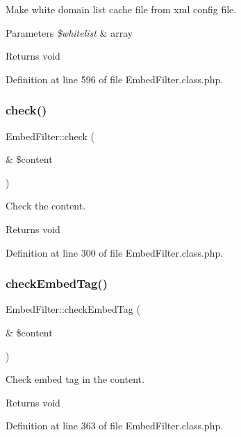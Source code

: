 Make white domain list cache file from xml config file. 
\begin{DoxyParams}{Parameters}
{\em \$whitelist} & array \\
\hline
\end{DoxyParams}
\begin{DoxyReturn}{Returns}
void 
\end{DoxyReturn}


Definition at line 596 of file Embed\+Filter.\+class.\+php.

\mbox{\label{classEmbedFilter_ae494226c2201ff0c6c4c85ba429a16cf}} 
\subsubsection{\texorpdfstring{check()}{check()}}
{\footnotesize\ttfamily Embed\+Filter\+::check (\begin{DoxyParamCaption}\item[{\&}]{\$content }\end{DoxyParamCaption})}

Check the content. \begin{DoxyReturn}{Returns}
void 
\end{DoxyReturn}


Definition at line 300 of file Embed\+Filter.\+class.\+php.

\mbox{\label{classEmbedFilter_a6b0bba8c1ef91ae9afe7f26675216cb3}} 
\subsubsection{\texorpdfstring{check\+Embed\+Tag()}{checkEmbedTag()}}
{\footnotesize\ttfamily Embed\+Filter\+::check\+Embed\+Tag (\begin{DoxyParamCaption}\item[{\&}]{\$content }\end{DoxyParamCaption})}

Check embed tag in the content. \begin{DoxyReturn}{Returns}
void 
\end{DoxyReturn}


Definition at line 363 of file Embed\+Filter.\+class.\+php.

